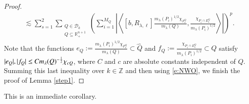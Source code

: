 \documentclass[12pt]{amsart}
\begin{document}
\begin{proof}
\begin{align}
&\lesssim  \sum_{s=1}^{2}\sum_{\substack{Q\in \mathcal{D}_{k}\\Q\subseteq \mathbb{R}_+^{n+1}}}\left(\sum_{i=1}^{M_Q}\left|\left\langle[b,R_{\lambda,\ell}] \frac{m_\lambda(P_{i})^{1/2}
\chi_{F_{s}^{Q}}}{m_\lambda(Q)},\frac{\chi_{P_i\cap E_{s}^{Q}}}{m_\lambda(P_{i})^{1/2}}\right\rangle\right|\right)^{p}.
\end{align}
Note that the functions $e_Q:=\frac{m_\lambda(P_{i})^{1/2}
\chi_{F_{s}^{Q}}}{m_\lambda(Q)} \subset \hat Q$ and $f_Q:=\frac{\chi_{P_i\cap E_{s}^{Q}}}{m_\lambda(P_{i})^{1/2}} \subset Q$ satisfy
$|e_Q|, |f_Q|\leq Cm_\lambda(Q)^{-{1\over2}}\chi_{cQ} $, where $C$ and $c$ are absolute constants independent of $Q$.
Summing this last inequality over $ k\in \mathbb Z $ and then using \eqref{e:NWO}, we finish the proof of   Lemma \ref{step1}.
\end{proof}

This is an immediate corollary.
\end{document}
